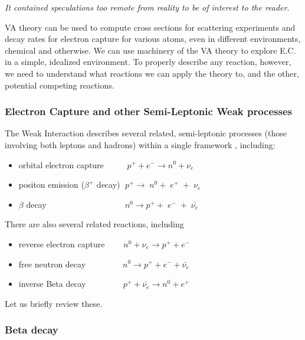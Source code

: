 \documentclass[%
 aip,
 jmp,%
 amsmath,amssymb,
 reprint,%
]{revtex4-1}
\begin{document}
\emph{It contained speculations too remote from reality to be of interest to the reader}.\cite{close}

VA theory can be used to compute cross sections for scattering experiments and decay rates for electron capture for various atoms,  even in different environments, chemical and otherwise.  We can use machinery of the VA theory to explore E.C. in a simple, idealized environment.  To properly describe any reaction, however, we need to understand what reactions we can apply the theory to, and the other, potential competing reactions.

\subsubsection{Electron Capture and other Semi-Leptonic Weak processes} 

The Weak Interaction describes several related, semi-leptonic processes (those involving both leptons and hadrons) within a single framework \cite{langanke}, including:

\begin{itemize}
\item orbital electron capture $\;\;\;\;\;\;\;\;\;p^{+}+e^{-} \rightarrow n^{0}+\nu_{e}$

\item positon emission ($\beta^{+}$ decay) $\;p^{+}\rightarrow\;n^{0}+\;e^{+}\;+\;\nu_{e}$ 
\item $\beta$ decay $\;\;\;\;\;\;\;\;\;\;\;\;\;\;\;\;\;\;\;\;\;\;\;\;\;\;\;\;\;\;\;\;\;n^{0}\rightarrow p^{+}+\;e^{-}\;+\;\bar{\nu_{e}}$
\end{itemize}

There are also several related reactions, including

\begin{itemize}
\item reverse electron capture  $\;\;\;\;\;\;\;n^{0}+\nu_{e}\rightarrow p^{+}+e^{-}$
\item free neutron decay  $\;\;\;\;\;\;\;\;\;\;\;\;\;\;\;n^{0}\rightarrow p^{+}+e^{-}+\bar{\nu_{e}}$ 
\item inverse Beta decay  $\;\;\;\;\;\;\;\;\;\;\;\;\;\;\;p^{+}+\bar{\nu_{e}} \rightarrow n^{0}+e^{+}$
\end{itemize}

Let us briefly review these.

\subsubsection{Beta decay} 
\end{document}
